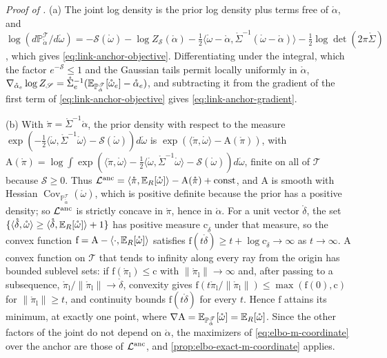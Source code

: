 \noindent\emph{Proof of .}
(a) The joint log density is the prior log density plus terms free of $\mathring\alpha$, and
$\log(d\mathbb P^{\mathscr T}_{\mathring\alpha}/d\mathring\omega)=-\mathscr S(\mathring\omega)-\log Z_{\mathscr S}(\mathring\alpha)-\tfrac12\langle\mathring\omega-\mathring\alpha,\mathring\Sigma^{-1}(\mathring\omega-\mathring\alpha)\rangle-\tfrac12\log\det(2\pi\mathring\Sigma)$,
which gives \eqref{eq:link-anchor-objective}. Differentiating under the integral, which the factor
$e^{-\mathscr S}\leq1$ and the Gaussian tails permit locally uniformly in $\mathring\alpha$,
$\nabla_{\mathring\alpha_e}\log Z_{\mathscr S}=\mathring\Sigma_e^{-1}(\mathbb E_{\mathbb P^{\mathscr T}_{\mathring\alpha}}[\mathring\omega_e]-\mathring\alpha_e)$,
and subtracting it from the gradient of the first term of \eqref{eq:link-anchor-objective} gives
\eqref{eq:link-anchor-gradient}.

(b) With $\mathring\pi=\mathring\Sigma^{-1}\mathring\alpha$, the prior density with respect to the
measure
$\exp(-\tfrac12\langle\mathring\omega,\mathring\Sigma^{-1}\mathring\omega\rangle-\mathscr S(\mathring\omega))d\mathring\omega$
is $\exp(\langle\mathring\pi,\mathring\omega\rangle-\mathrm A(\mathring\pi))$, with
$\mathrm A(\mathring\pi)=\log\int\exp(\langle\mathring\pi,\mathring\omega\rangle-\tfrac12\langle\mathring\omega,\mathring\Sigma^{-1}\mathring\omega\rangle-\mathscr S(\mathring\omega))d\mathring\omega$,
finite on all of $\mathscr T$ because $\mathscr S\geq0$. Thus
$\mathcal L^{\mathrm{anc}}=\langle\mathring\pi,\mathbb E_R[\mathring\omega]\rangle-\mathrm A(\mathring\pi)+\mathrm{const}$, and
$\mathrm A$ is smooth with Hessian $\operatorname{Cov}_{\mathbb P^{\mathscr T}_{\mathring\alpha}}(\mathring\omega)$,
which is positive definite because the prior has a positive density; so $\mathcal L^{\mathrm{anc}}$ is strictly concave in
$\mathring\pi$, hence in $\mathring\alpha$. For a unit vector $\mathring\delta$, the set
$\{\langle\mathring\delta,\mathring\omega\rangle\geq\langle\mathring\delta,\mathbb E_R[\mathring\omega]\rangle+1\}$ has
positive measure $\mathrm c_{\mathring\delta}$ under that measure, so the convex function
$\mathrm f=\mathrm A-\langle\cdot,\mathbb E_R[\mathring\omega]\rangle$ satisfies
$\mathrm f(t\mathring\delta)\geq t+\log\mathrm c_{\mathring\delta}\to\infty$ as $t\to\infty$. A convex function
on $\mathscr T$ that tends to infinity along every ray from the origin has bounded sublevel sets: if
$\mathrm f(\mathring\pi_{\mathrm l})\leq\mathrm c$ with $\lVert\mathring\pi_{\mathrm l}\rVert\to\infty$ and, after
passing to a subsequence, $\mathring\pi_{\mathrm l}/\lVert\mathring\pi_{\mathrm l}\rVert\to\mathring\delta$,
convexity gives
$\mathrm f(t\mathring\pi_{\mathrm l}/\lVert\mathring\pi_{\mathrm l}\rVert)\leq\max(\mathrm f(0),\mathrm c)$ for
$\lVert\mathring\pi_{\mathrm l}\rVert\geq t$, and continuity bounds $\mathrm f(t\mathring\delta)$ for every $t$. Hence
$\mathrm f$ attains its minimum, at exactly one point, where
$\nabla\mathrm A=\mathbb E_{\mathbb P^{\mathscr T}_{\mathring\alpha}}[\mathring\omega]=\mathbb E_R[\mathring\omega]$.
Since the other factors of the joint do not depend on $\mathring\alpha$, the maximizers of
\eqref{eq:elbo-m-coordinate} over the anchor are those of $\mathcal L^{\mathrm{anc}}$, and \cref{prop:elbo-exact-m-coordinate}
applies.

